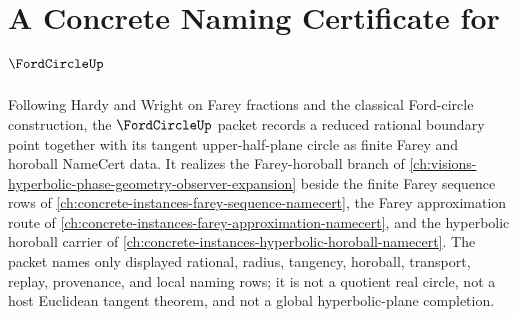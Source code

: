 \chapter{A Concrete Naming Certificate for $\FordCircleUp$}
\label{ch:concrete-instances-ford-circle-namecert}

Following Hardy and Wright on Farey fractions and the classical Ford-circle construction, the $\FordCircleUp$ packet records a reduced rational boundary point together with its tangent upper-half-plane circle as finite Farey and horoball NameCert data. It realizes the Farey-horoball branch of \autoref{ch:visions-hyperbolic-phase-geometry-observer-expansion} beside the finite Farey sequence rows of \autoref{ch:concrete-instances-farey-sequence-namecert}, the Farey approximation route of \autoref{ch:concrete-instances-farey-approximation-namecert}, and the hyperbolic horoball carrier of \autoref{ch:concrete-instances-hyperbolic-horoball-namecert}. The packet names only displayed rational, radius, tangency, horoball, transport, replay, provenance, and local naming rows; it is not a quotient real circle, not a host Euclidean tangent theorem, and not a global hyperbolic-plane completion.

